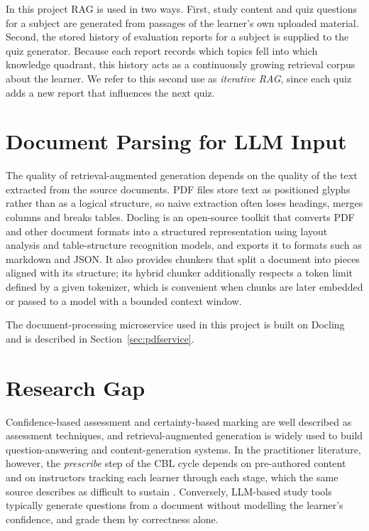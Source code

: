 \documentclass[12pt,a4paper,oneside]{report}
\begin{document}
In this project RAG is used in two ways. First, study content and quiz
questions for a subject are generated from passages of the learner's own
uploaded material. Second, the stored history of evaluation reports for a
subject is supplied to the quiz generator. Because each report records
which topics fell into which knowledge quadrant, this history acts as a
continuously growing retrieval corpus about the learner. We refer to this
second use as \emph{iterative RAG}, since each quiz adds a new report that
influences the next quiz.

\section{Document Parsing for LLM Input}

The quality of retrieval-augmented generation depends on the quality of
the text extracted from the source documents. PDF files store text as
positioned glyphs rather than as a logical structure, so naive extraction
often loses headings, merges columns and breaks tables. Docling
\cite{auer2024docling} is an open-source toolkit that converts PDF and
other document formats into a structured representation using layout
analysis and table-structure recognition models, and exports it to
formats such as markdown and JSON. It also provides chunkers that split a
document into pieces aligned with its structure; its hybrid chunker
additionally respects a token limit defined by a given tokenizer, which is
convenient when chunks are later embedded or passed to a model with a
bounded context window.

The document-processing microservice used in this project is built on
Docling and is described in Section~\ref{sec:pdfservice}.

\section{Research Gap}

Confidence-based assessment and certainty-based marking are well described
as assessment techniques, and retrieval-augmented generation is widely used
to build question-answering and content-generation systems. In the
practitioner literature, however, the \emph{prescribe} step of the CBL
cycle depends on pre-authored content and on instructors tracking each
learner through each stage, which the same source describes as difficult
to sustain \cite{benchprep}. Conversely, LLM-based study tools typically
generate questions from a document without modelling the learner's
confidence, and grade them by correctness alone.
\end{document}
